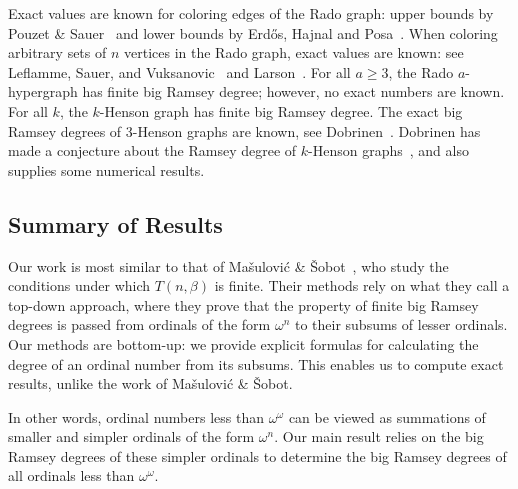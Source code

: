 \documentclass[10pt,a4paper]{article}
\newcommand{\om}{\omega}
\theoremstyle{plain}
\theoremstyle{definition}
\begin{document}
Exact values are known for
coloring edges of the Rado graph:
upper bounds by
Pouzet \& Sauer~\cite{PS-1996} and
lower bounds by 
Erd\H{o}s, Hajnal and Posa~\cite{EHP-1975}. 
When coloring arbitrary sets of $n$ vertices in
the Rado graph,
exact values are known: see Leflamme, Sauer, and
Vuksanovic~\cite{LSV-2006} and Larson~\cite{Larson-2008}.
For all $a\ge 3$, the Rado $a$-hypergraph has finite big Ramsey degree;
however, no exact numbers are known. 
For all $k$, the $k$-Henson graph has finite big Ramsey degree. The exact big Ramsey degrees of 3-Henson graphs are known, see Dobrinen~\cite[Corollary 5.13]{Dobrinen-2020-II}. Dobrinen has made a conjecture about the Ramsey degree of $k$-Henson graphs~\cite[Section 11: Future Directions]{Dobrinen-2023},
and also supplies some numerical results. 

\subsection{Summary of Results}


Our work is most similar to that of Ma\v{s}ulovi\'{c} \& \v{S}obot~\cite{MS-2021},
who study the conditions under which $T(n,\beta)$ is finite. Their methods
rely on what they call a top-down approach, where they prove that the
property of finite big Ramsey degrees is passed from ordinals of the form $\om^n$
to their subsums of lesser ordinals. Our methods are bottom-up: we provide explicit formulas
for calculating the degree of an ordinal number from its subsums. This enables
us to compute exact results, unlike the work of Ma\v{s}ulovi\'{c} \& \v{S}obot.

In other words, ordinal
numbers less than $\om^\om$ can be viewed as summations of smaller
and simpler ordinals of the form $\om^n$. Our main result relies on the
big Ramsey degrees of these simpler ordinals to determine the big Ramsey
degrees of all ordinals less than $\om^\om.$
\end{document}
